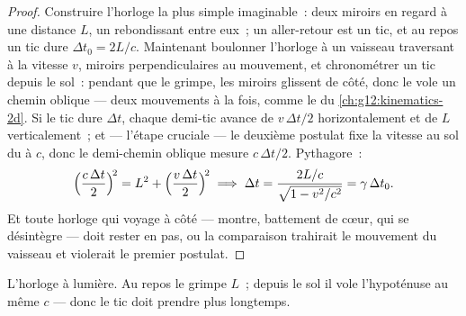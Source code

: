 \begin{proof}
Construire l'horloge la plus simple imaginable~: deux miroirs en
regard à une distance $L$, un  rebondissant entre
eux~; un aller-retour est un tic, et au repos un tic dure
$\Delta t_0 = 2L/c$. Maintenant boulonner l'horloge à un vaisseau
traversant à la vitesse $v$, miroirs perpendiculaires au mouvement, et
chronométrer un tic depuis le sol~: pendant que le
 grimpe, les miroirs glissent de côté, donc le
 vole un chemin oblique --- deux mouvements à la
fois, comme le  du
\cref{ch:g12:kinematics-2d}. Si le tic dure $\Delta t$, chaque
demi-tic avance de $v\,\Delta t/2$ horizontalement et de $L$
verticalement~; et --- l'étape cruciale --- le
deuxième postulat fixe la vitesse au sol du
 à $c$, donc le demi-chemin oblique mesure
$c\,\Delta t/2$. Pythagore~:
\[
\Bigl(\frac{c\,\Delta t}{2}\Bigr)^{\!2} = L^2 + \Bigl(\frac{v\,\Delta t}{2}\Bigr)^{\!2}
\;\Longrightarrow\;
\Delta t = \frac{2L/c}{\sqrt{1 - v^2/c^2}} = \gamma\,\Delta t_0 .
\]
Et toute horloge qui voyage à côté --- montre, battement de cœur,
 qui se désintègre --- doit rester en
pas, ou la comparaison trahirait le mouvement du vaisseau et
violerait le premier postulat.
\end{proof}

\begin{omfigure}
\qquad
{}

{\small L'horloge à lumière. Au repos le
 grimpe $L$~; depuis le sol il vole
l'hypoténuse au même $c$ --- donc le tic doit prendre plus longtemps.}
\end{omfigure}

